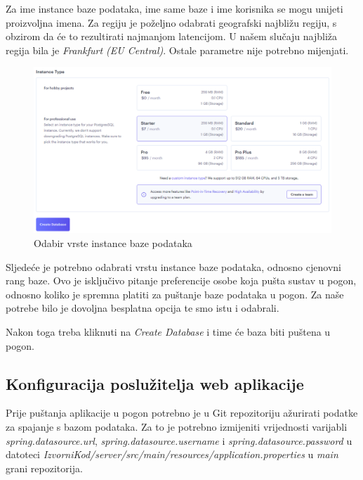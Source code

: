 			Za ime instance baze podataka, ime same baze i ime korisnika se mogu unijeti proizvoljna imena. Za regiju je poželjno odabrati geografski najbližu regiju, s obzirom da će to rezultirati najmanjom latencijom. U našem slučaju najbliža regija bila je \textit{Frankfurt (EU Central)}. Ostale parametre nije potrebno mijenjati.
			
			\begin{figure}[H]
				\includegraphics[width=\textwidth]{slike/upute/bazaPlacanje.png} %
				\caption{Odabir vrste instance baze podataka}
				\label{fig:bazaPlacanje} %
			\end{figure}
			
			Sljedeće je potrebno odabrati vrstu instance baze podataka, odnosno cjenovni rang baze. Ovo je isključivo pitanje preferencije osobe koja pušta sustav u pogon, odnosno koliko je spremna platiti za puštanje baze podataka u pogon. Za naše potrebe bilo je dovoljna besplatna opcija te smo istu i odabrali.
			
			Nakon toga treba kliknuti na \textit{Create Database} i time će baza biti puštena u pogon.
			
			\subsection{Konfiguracija poslužitelja web aplikacije}
			
			Prije puštanja aplikacije u pogon potrebno je u Git repozitoriju ažurirati podatke za spajanje s bazom podataka. Za to je potrebno izmijeniti vrijednosti varijabli \textit{spring.datasource.url}, \textit{spring.datasource.username} i \textit{spring.datasource.password} u datoteci \textit{IzvorniKod/server/src/main/resources/application.properties} u \textit{main} grani repozitorija. 
			
